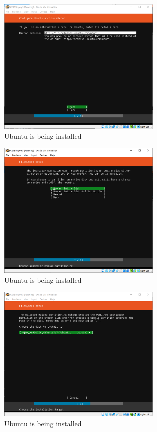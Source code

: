 \documentclass{article}
\begin{document}
\begin{figure}[H]
  \caption{Ubuntu is being installed}
  \centering
  \includegraphics[width=0.7\textwidth]{ECE4310_Proj3_1_installing_6.png}
\end{figure}

\begin{figure}[H]
  \caption{Ubuntu is being installed}
  \centering
  \includegraphics[width=0.7\textwidth]{ECE4310_Proj3_1_installing_7.png}
\end{figure}

\begin{figure}[H]
  \caption{Ubuntu is being installed}
  \centering
  \includegraphics[width=0.7\textwidth]{ECE4310_Proj3_1_installing_7_2.png}
\end{figure}
\end{document}

